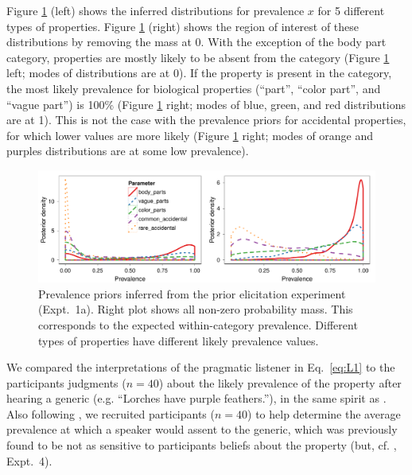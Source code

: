 \documentclass[10pt,letterpaper]{article}
\begin{document}
Figure \ref{fig:prior2} (left) shows the inferred distributions for prevalence $x$ for 5 different types of properties. 
Figure \ref{fig:prior2} (right) shows the region of interest of these distributions by removing the mass at 0. 
With the exception of the body part category, properties are mostly likely to be absent from the category (Figure \ref{fig:prior2} left; modes of distributions are at 0).
If the property is present in the category, the most likely prevalence for biological properties (``part'', ``color part'', and ``vague part'') is 100\% (Figure \ref{fig:prior2} right; modes of blue, green, and red distributions are at 1).
This is not the case with the prevalence priors for accidental properties, for which lower values are more likely (Figure \ref{fig:prior2} right; modes of orange and purples distributions are at some low prevalence).


\begin{figure}
\centering
    \includegraphics[width=\columnwidth]{prior2_prevalenceprior-50kx3.pdf}
    \caption{Prevalence priors inferred from the prior elicitation experiment  (Expt.~1a). Right plot shows all non-zero probability mass. This corresponds to the expected within-category prevalence. Different types of properties have different likely prevalence values.}
  \label{fig:prior2}
\end{figure}

We compared the interpretations of the pragmatic listener in Eq.~\ref{eq:L1} to the participants judgments ($n=40$) about the likely prevalence of the property after hearing a generic (e.g. ``Lorches have purple feathers.''), in the same spirit as . Also following , we recruited participants ($n=40$) to help determine the average prevalence at which a speaker would assent to the generic, which was previously found to be not as sensitive to participants beliefs about the property (but, cf. , Expt.~4).
\end{document}
